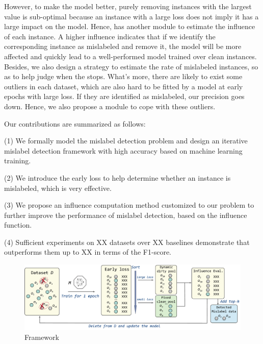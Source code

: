 However, to make the model better, purely removing instances with the largest value is sub-optimal because an instance with a large loss does not imply it has a large impact on the model. Hence, \sys has another module  to estimate the influence of each instance. A higher influence indicates that if we identify the corresponding instance as mislabeled and remove it, the model will be more affected and quickly lead to a well-performed model trained over clean instances. Besides, we also design a strategy to estimate the rate of mislabeled instances, so as to help judge when the \sys stops. What's more, there are likely to  exist some outliers in each dataset, which are also hard to be  fitted by a model at early epochs with large loss. If they are identified as mislabeled, our precision goes down. Hence, we also propose a module to cope with these outliers.


Our contributions are summarized as follows:

\noindent (1) We formally model the mislabel detection problem and  design an iterative mislabel detection framework \sys with high accuracy based on machine learning training.

\noindent (2) We introduce the early loss to help determine whether an instance is mislabeled, which is very effective.

\noindent (3) We propose an influence computation method customized to our problem to further improve the performance of  mislabel detection, based on the influence function. 

\noindent (4) Sufficient experiments on XX datasets over XX baselines demonstrate that \sys outperforms them up to XX in terms of the F1-score.

\begin{figure}
	\centering
	\includegraphics[width=\textwidth]{figures/framework}
	\caption{\sys Framework}
	\label{fig:framework}
\end{figure}






